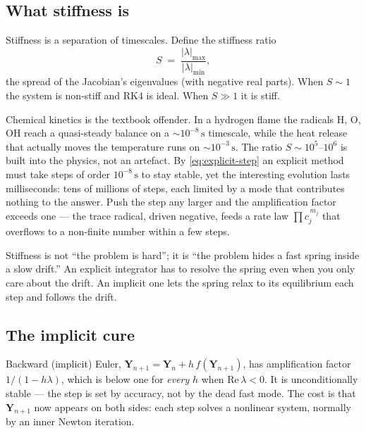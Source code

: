 \documentclass[11pt,a4paper]{article}
\newcommand{\Yv}{\mathbf{Y}}                          %
\begin{document}
\subsection{What stiffness is}

Stiffness is a separation of timescales.  Define the stiffness ratio
\begin{equation}
    S \;=\; \frac{|\lambda|_{\max}}{|\lambda|_{\min}},
    \label{eq:stiffness-ratio}
\end{equation}
the spread of the Jacobian's eigenvalues (with negative real parts).
When $S \sim 1$ the system is non-stiff and RK4 is ideal.  When
$S \gg 1$ it is stiff.

Chemical kinetics is the textbook offender.  In a hydrogen flame the
radicals $\mathrm{H}$, $\mathrm{O}$, $\mathrm{OH}$ reach a quasi-steady balance on a
$\sim 10^{-8}\,\mathrm{s}$ timescale, while the heat release that
actually moves the temperature runs on $\sim 10^{-3}\,\mathrm{s}$.
The ratio $S \sim 10^{5}$--$10^{6}$ is built into the physics, not an
artefact.  By \eqref{eq:explicit-step} an explicit method must take
steps of order $10^{-8}\,\mathrm{s}$ to stay stable, yet the
interesting evolution lasts milliseconds: tens of millions of steps,
each limited by a mode that contributes nothing to the answer.  Push
the step any larger and the amplification factor exceeds one --- the
trace radical, driven negative, feeds a rate law $\prod c_j^{\,m_j}$
that overflows to a non-finite number within a few steps.

\begin{intuition}
Stiffness is not ``the problem is hard''; it is ``the problem hides a
fast spring inside a slow drift.''  An explicit integrator has to
resolve the spring even when you only care about the drift.  An
implicit one lets the spring relax to its equilibrium each step and
follows the drift.
\end{intuition}

\subsection{The implicit cure}

Backward (implicit) Euler, $\Yv_{n+1} = \Yv_n + h\,f(\Yv_{n+1})$, has
amplification factor $1/(1-h\lambda)$, which is below one for
\emph{every} $h$ when $\mathrm{Re}\,\lambda < 0$.  It is
unconditionally stable --- the step is set by accuracy, not by the
dead fast mode.  The cost is that $\Yv_{n+1}$ now appears on both
sides: each step solves a nonlinear system, normally by an inner
Newton iteration.
\end{document}
